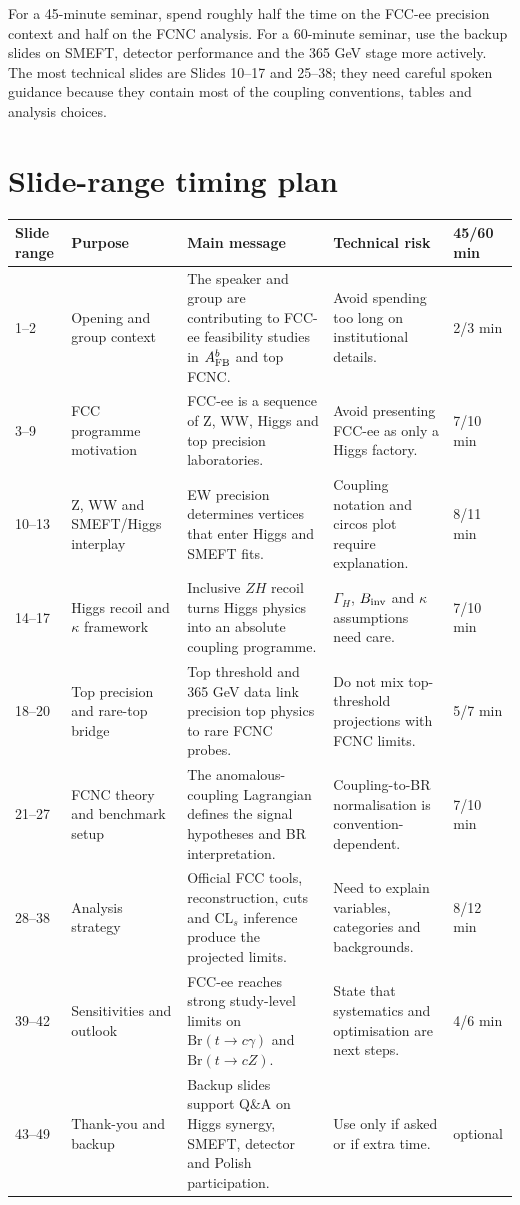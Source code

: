 \documentclass[11pt,a4paper]{report}
\newcommand{\br}{\mathrm{Br}}
\begin{document}
\begin{talknotebox}
	
For a 45-minute seminar, spend roughly half the time on the FCC-ee precision context and half on the FCNC analysis.  For a 60-minute seminar, use the backup slides on SMEFT, detector performance and the 365 GeV stage more actively.  The most technical slides are Slides 10--17 and 25--38; they need careful spoken guidance because they contain most of the coupling conventions, tables and analysis choices.
\end{talknotebox}


\section{Slide-range timing plan}

\begin{longtable}{p{}p{}p{}p{}p{}}
\toprule
Slide range & Purpose & Main message & Technical risk & 45/60 min \\
\midrule
1--2 & Opening and group context & The speaker and group are contributing to FCC-ee feasibility studies in $A_{\rm FB}^b$ and top FCNC. & Avoid spending too long on institutional details. & 2/3 min \\
3--9 & FCC programme motivation & FCC-ee is a sequence of Z, WW, Higgs and top precision laboratories. & Avoid presenting FCC-ee as only a Higgs factory. & 7/10 min \\
10--13 & Z, WW and SMEFT/Higgs interplay & EW precision determines vertices that enter Higgs and SMEFT fits. & Coupling notation and circos plot require explanation. & 8/11 min \\
14--17 & Higgs recoil and $\kappa$ framework & Inclusive $ZH$ recoil turns Higgs physics into an absolute coupling programme. & $\Gamma_H$, $B_{\rm inv}$ and $\kappa$ assumptions need care. & 7/10 min \\
18--20 & Top precision and rare-top bridge & Top threshold and 365 GeV data link precision top physics to rare FCNC probes. & Do not mix top-threshold projections with FCNC limits. & 5/7 min \\
21--27 & FCNC theory and benchmark setup & The anomalous-coupling Lagrangian defines the signal hypotheses and BR interpretation. & Coupling-to-BR normalisation is convention-dependent. & 7/10 min \\
28--38 & Analysis strategy & Official FCC tools, reconstruction, cuts and CL$_s$ inference produce the projected limits. & Need to explain variables, categories and backgrounds. & 8/12 min \\
39--42 & Sensitivities and outlook & FCC-ee reaches strong study-level limits on $\br(t\to c\gamma)$ and $\br(t\to cZ)$. & State that systematics and optimisation are next steps. & 4/6 min \\
43--49 & Thank-you and backup & Backup slides support Q\&A on Higgs synergy, SMEFT, detector and Polish participation. & Use only if asked or if extra time. & optional \\
\bottomrule
\end{longtable}
\end{document}
